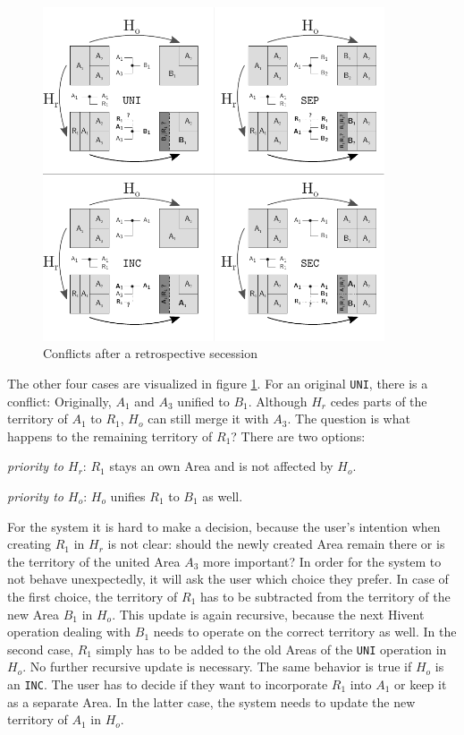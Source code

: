 \begin{figure}[ht]
\vspace{1em}
  \centering
  \includegraphics[width=0.9\textwidth]{graphics/development/editing_hivent_data/retrospective_updates/SEC}
  \caption{Conflicts after a retrospective secession}
  \label{fig:update_conflict_SEC}
\end{figure}

The other four cases are visualized in figure \ref{fig:update_conflict_SEC}. For an original \texttt{UNI}, there is a conflict: Originally, $A_1$ and $A_3$ unified to $B_1$. Although $H_r$ cedes parts of the territory of $A_1$ to $R_1$, $H_o$ can still merge it with $A_3$. The question is what happens to the remaining territory of $R_1$? There are two options:
\begin{compactenum}
  \item
  \emph{priority to $H_r$}:
  $R_1$ stays an own Area and is not affected by $H_o$.
  \item
  \emph{priority to $H_o$}:
  $H_o$ unifies $R_1$ to $B_1$ as well.
\end{compactenum}

For the system it is hard to make a decision, because the user's intention when creating $R_1$ in $H_r$ is not clear: should the newly created Area remain there or is the territory of the united Area $A_3$ more important? In order for the system to not behave unexpectedly, it will ask the user which choice they prefer. In case of the first choice, the territory of $R_1$ has to be subtracted from the territory of the new Area $B_1$ in $H_o$. This update is again recursive, because the next Hivent operation dealing with $B_1$ needs to operate on the correct territory as well. In the second case, $R_1$ simply has to be added to the old Areas of the \texttt{UNI} operation in $H_o$. No further recursive update is necessary. The same behavior is true if $H_o$ is an \texttt{INC}. The user has to decide if they want to incorporate $R_1$ into $A_1$ or keep it as a separate Area. In the latter case, the system needs to update the new territory of $A_1$ in $H_o$.

